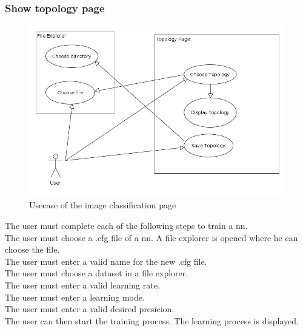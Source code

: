 \documentclass[parskip=full]{scrartcl}
\begin{document}
\subsubsection{Show topology page}
\begin{figure}[htb!]
\centering
\includegraphics[width=\textwidth]{ShowTopoUsecase}
\caption{Usecase of the image classification page}
\end{figure}
The user must complete each of the following steps to train a \gls{nn}.
\\ The user must choose a .cfg file of a \gls{nn}. A file explorer is opened where he can choose the file.
\\ The user must enter a valid name for the new .cfg file.
\\ The user must choose a dataset in a file explorer. 
\\ The user must enter a valid learning rate.
\\ The user must enter a learning mode. 
\\ The user must enter a valid desired presicion.
\\ The user can then start the training process. The learning process is displayed.
\newpage
\end{document}
